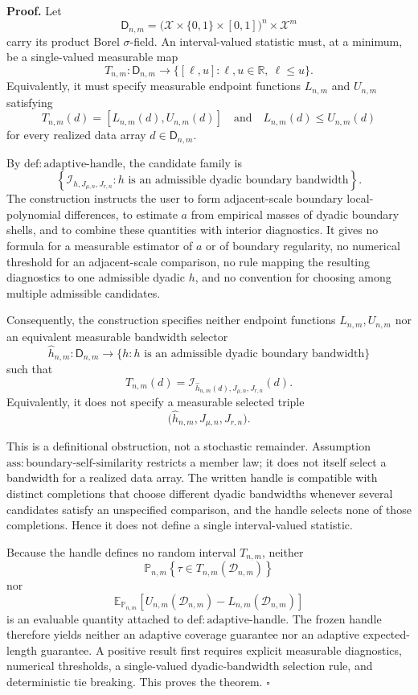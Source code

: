 \textbf{Proof.}
Let
\[
\mathsf D_{n,m}
=\bigl(\mathcal X\times\{0,1\}\times[0,1]\bigr)^n\times\mathcal X^m
\]
carry its product Borel \(\sigma\)-field. An interval-valued statistic must, at a minimum, be a single-valued measurable map
\[
T_{n,m}:\mathsf D_{n,m}\longrightarrow
\bigl\{[\ell,u]:\ell,u\in\mathbb R,\ \ell\le u\bigr\}.
\]
Equivalently, it must specify measurable endpoint functions \(L_{n,m}\) and \(U_{n,m}\) satisfying
\[
T_{n,m}(d)=[L_{n,m}(d),U_{n,m}(d)]
\quad\text{and}\quad
L_{n,m}(d)\le U_{n,m}(d)
\]
for every realized data array \(d\in\mathsf D_{n,m}\).

By \(\mathrm{def:adaptive\text{-}handle}\), the candidate family is
\[
\left\{\mathcal I_{h,J_{\mu,n},J_{r,n}}:
h\text{ is an admissible dyadic boundary bandwidth}\right\}.
\]
The construction instructs the user to form adjacent-scale boundary local-polynomial differences, to estimate \(a\) from empirical masses of dyadic boundary shells, and to combine these quantities with interior diagnostics. It gives no formula for a measurable estimator of \(a\) or of boundary regularity, no numerical threshold for an adjacent-scale comparison, no rule mapping the resulting diagnostics to one admissible dyadic \(h\), and no convention for choosing among multiple admissible candidates.

Consequently, the construction specifies neither endpoint functions \(L_{n,m},U_{n,m}\) nor an equivalent measurable bandwidth selector
\[
\widehat h_{n,m}:\mathsf D_{n,m}\longrightarrow
\{h:h\text{ is an admissible dyadic boundary bandwidth}\}
\]
such that
\[
T_{n,m}(d)
=\mathcal I_{\widehat h_{n,m}(d),J_{\mu,n},J_{r,n}}(d).
\]
Equivalently, it does not specify a measurable selected triple
\[
\bigl(\widehat h_{n,m},J_{\mu,n},J_{r,n}\bigr).
\]

This is a definitional obstruction, not a stochastic remainder. Assumption \(\mathrm{ass:boundary\text{-}self\text{-}similarity}\) restricts a member law; it does not itself select a bandwidth for a realized data array. The written handle is compatible with distinct completions that choose different dyadic bandwidths whenever several candidates satisfy an unspecified comparison, and the handle selects none of those completions. Hence it does not define a single interval-valued statistic.

Because the handle defines no random interval \(T_{n,m}\), neither
\[
\mathbb P_{n,m}\!\left\{\tau\in T_{n,m}(\mathcal D_{n,m})\right\}
\]
nor
\[
\mathbb E_{\mathbb P_{n,m}}\!\left[
U_{n,m}(\mathcal D_{n,m})-L_{n,m}(\mathcal D_{n,m})
\right]
\]
is an evaluable quantity attached to \(\mathrm{def:adaptive\text{-}handle}\). The frozen handle therefore yields neither an adaptive coverage guarantee nor an adaptive expected-length guarantee. A positive result first requires explicit measurable diagnostics, numerical thresholds, a single-valued dyadic-bandwidth selection rule, and deterministic tie breaking. This proves the theorem. \(\square\)